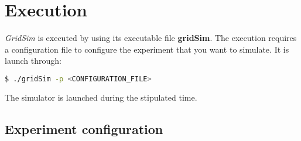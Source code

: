 \chapter{Execution}
\label{chap:execution}

{\it GridSim} is executed by using its executable file {\bf gridSim}.
The execution requires a configuration file to configure the experiment that you want to simulate.
It is launch through:
\begin{lstlisting}[language=bash]
  $ ./gridSim -p <CONFIGURATION_FILE>
\end{lstlisting}
\noindent
The simulator is launched during the stipulated time.

%
\section{Experiment configuration}













